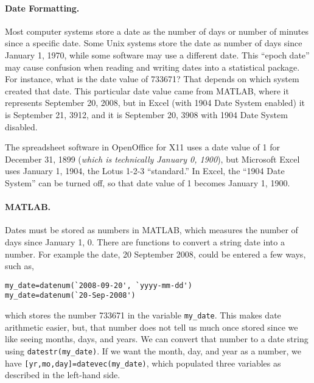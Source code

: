 \paragraph{Date Formatting.} Most computer systems store a date as the number of days or number of minutes since a specific date.
\marginpar{\begin{small}\begin{flushleft}\textcolor{red}{Be aware of the computer epoch date of the system you import and export into.}\end{flushleft}\end{small}}
Some Unix systems store the date as number of days since January 1, 1970, while some software may use a different date. This ``epoch date'' may cause confusion when reading and writing dates into a statistical package. For instance, what is the date value of 733671? That depends on which system created that date. This particular date value came from MATLAB, where it represents September 20, 2008, but in Excel (with 1904 Date System enabled) it is September 21, 3912, and it is September 20, 3908 with 1904 Date System disabled.

The spreadsheet software in OpenOffice for X11 uses a date value of 1 for December 31, 1899 (\emph{which is technically January 0, 1900}), but Microsoft Excel uses January 1, 1904, the Lotus 1-2-3 ``standard.'' In Excel, the ``1904 Date System'' can be turned off, so that date value of 1 becomes January 1, 1900.

\paragraph{MATLAB.} Dates must be stored as numbers in MATLAB, which measures the number of days since January 1, 0. There are functions to convert a string date into a number. For example the date, 20 September 2008, could be entered a few ways, such as,
\begin{verbatim}
my_date=datenum(`2008-09-20', `yyyy-mm-dd')
my_date=datenum(`20-Sep-2008')
\end{verbatim}
which stores the number 733671 in the variable \texttt{my\_date}. This makes date arithmetic easier, but, that number does not tell us much once stored since we like seeing months, days, and years. We can convert that number to a date string using \texttt{datestr(my\_date)}. If we want the month, day, and year as a number, we have \texttt{[yr,mo,day]=datevec(my\_date)}, which populated three variables as described in the left-hand side.

